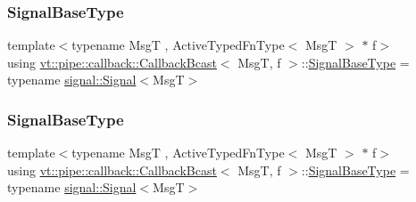 \subsubsection{\texorpdfstring{Signal\+Base\+Type}{SignalBaseType}\hspace{0.1cm}{\footnotesize\ttfamily [1/2]}}
{\footnotesize\ttfamily template$<$typename MsgT , Active\+Typed\+Fn\+Type$<$ Msg\+T $>$ $\ast$ f$>$ \\
using \hyperlink{structvt_1_1pipe_1_1callback_1_1_callback_bcast}{vt\+::pipe\+::callback\+::\+Callback\+Bcast}$<$ MsgT, f $>$\+::\hyperlink{structvt_1_1pipe_1_1callback_1_1_callback_bcast_a25891ab2b71bd3b3883df52172412607}{Signal\+Base\+Type} =  typename \hyperlink{structvt_1_1pipe_1_1signal_1_1_signal}{signal\+::\+Signal}$<$MsgT$>$}

\mbox{\label{structvt_1_1pipe_1_1callback_1_1_callback_bcast_a25891ab2b71bd3b3883df52172412607}} 
\subsubsection{\texorpdfstring{Signal\+Base\+Type}{SignalBaseType}\hspace{0.1cm}{\footnotesize\ttfamily [2/2]}}
{\footnotesize\ttfamily template$<$typename MsgT , Active\+Typed\+Fn\+Type$<$ Msg\+T $>$ $\ast$ f$>$ \\
using \hyperlink{structvt_1_1pipe_1_1callback_1_1_callback_bcast}{vt\+::pipe\+::callback\+::\+Callback\+Bcast}$<$ MsgT, f $>$\+::\hyperlink{structvt_1_1pipe_1_1callback_1_1_callback_bcast_a25891ab2b71bd3b3883df52172412607}{Signal\+Base\+Type} =  typename \hyperlink{structvt_1_1pipe_1_1signal_1_1_signal}{signal\+::\+Signal}$<$MsgT$>$}

\mbox{\label{structvt_1_1pipe_1_1callback_1_1_callback_bcast_aaf994b71056001334d30d74fa9c958f9}} 
